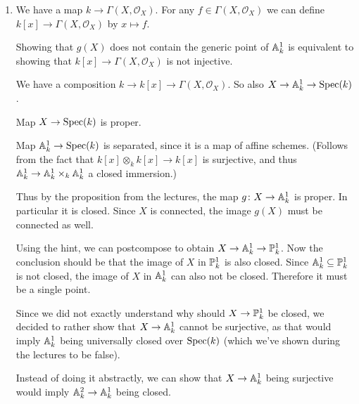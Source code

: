 \begin{exercise}{3}
    \begin{enumerate}
        \item{
                We have a map $k \rightarrow \Gamma(X, \mathcal{O}_X)$.
                For any $f \in \Gamma(X, \mathcal{O}_X)$ we can define $k[x]
                \rightarrow \Gamma(X, \mathcal{O}_X)$ by $x \mapsto f$.

                Showing that $g(X)$ does not contain the generic point of
                $\mathbb{A}^1_k$ is equivalent to showing that $k[x] \to
                \Gamma(X, \mathcal{O}_X)$ is not injective.

                We have a composition $k \to k[x] \to \Gamma(X, \mathcal{O}_X)$.
                So also $X \to \mathbb{A}^1_k \to \operatorname{Spec}(k)$.

                Map $X \to \operatorname{Spec}(k)$ is proper.

                Map $\mathbb{A}^1_k \to \operatorname{Spec}(k)$ is separated, since it is a map of
                affine schemes. (Follows from the fact that $k[x] \otimes_k k[x]
                \to k[x]$ is surjective, and thus $\mathbb{A}^1_k \to \mathbb{A}^1_k
                \times_k \mathbb{A}^1_k$ a closed immersion.)

                Thus by the proposition from the lectures, the map $g \colon X \to
                \mathbb{A}^1_k$ is proper. In particular it is closed. Since $X$ is
                connected, the image $g(X)$ must be connected as well.

                Using the hint, we can postcompose to obtain $X \to \mathbb{A}^1_k \to
                \mathbb{P}^1_k$.
                Now the conclusion should be that the image of $X$ in
                $\mathbb{P}^1_k$ is also closed. Since $\mathbb{A}^1_k \subseteq \mathbb{P}^1_k$
                is not closed, the image of $X$ in $\mathbb{A}^1_k$ can also not be
                closed. Therefore it must be a single point.

                Since we did not exactly understand why should $X \to \mathbb{P}^1_k$
                be closed, we decided to rather show that $X \to \mathbb{A}^1_k$
                cannot be surjective, as that would imply $\mathbb{A}^1_k$ being
                universally closed over $\operatorname{Spec}(k)$ (which we've shown during the
                lectures to be false). 

                Instead of doing it abstractly, we can show that $X \to
                \mathbb{A}^1_k$ being surjective would imply $\mathbb{A}^2_k \to \mathbb{A}^1_k$
                being closed.

}
\end{enumerate}
\end{exercise}
